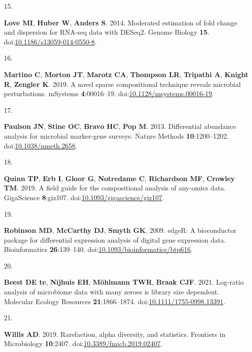 \documentclass[
]{article}
\newlength{\cslhangindent}
\newlength{\csllabelwidth}
\newlength{\cslentryspacingunit} %
\newenvironment{CSLReferences}[2] %
 {%
  \setlength{\parindent}{0pt}
  \ifodd #1
  \let\oldpar\par
  \def\par{\hangindent=\cslhangindent\oldpar}
  \fi
  \setlength{\parskip}{#2\cslentryspacingunit}
 }%
 {}
\newcommand{\CSLLeftMargin}[1]{\parbox[t]{\csllabelwidth}{#1}}
\newcommand{\CSLRightInline}[1]{\parbox[t]{\linewidth - \csllabelwidth}{#1}\break}
\begin{document}
\begin{CSLReferences}{0}{1}
\leavevmode{}%
\CSLLeftMargin{15. }%
\CSLRightInline{\textbf{Love MI}, \textbf{Huber W}, \textbf{Anders S}.
2014. Moderated estimation of fold change and dispersion for {RNA}-seq
data with {DESeq}2. Genome Biology \textbf{15}.
doi:\href{https://doi.org/10.1186/s13059-014-0550-8}{10.1186/s13059-014-0550-8}.}

\leavevmode{}%
\CSLLeftMargin{16. }%
\CSLRightInline{\textbf{Martino C}, \textbf{Morton JT}, \textbf{Marotz
CA}, \textbf{Thompson LR}, \textbf{Tripathi A}, \textbf{Knight R},
\textbf{Zengler K}. 2019. A novel sparse compositional technique reveals
microbial perturbations. {mSystems} \textbf{4}:00016--19.
doi:\href{https://doi.org/10.1128/msystems.00016-19}{10.1128/msystems.00016-19}.}

\leavevmode{}%
\CSLLeftMargin{17. }%
\CSLRightInline{\textbf{Paulson JN}, \textbf{Stine OC}, \textbf{Bravo
HC}, \textbf{Pop M}. 2013. Differential abundance analysis for microbial
marker-gene surveys. Nature Methods \textbf{10}:1200--1202.
doi:\href{https://doi.org/10.1038/nmeth.2658}{10.1038/nmeth.2658}.}

\leavevmode{}%
\CSLLeftMargin{18. }%
\CSLRightInline{\textbf{Quinn TP}, \textbf{Erb I}, \textbf{Gloor G},
\textbf{Notredame C}, \textbf{Richardson MF}, \textbf{Crowley TM}. 2019.
A field guide for the compositional analysis of any-omics data.
{GigaScience} \textbf{8}:giz107.
doi:\href{https://doi.org/10.1093/gigascience/giz107}{10.1093/gigascience/giz107}.}

\leavevmode{}%
\CSLLeftMargin{19. }%
\CSLRightInline{\textbf{Robinson MD}, \textbf{McCarthy DJ},
\textbf{Smyth GK}. 2009. {edgeR}: A bioconductor package for
differential expression analysis of digital gene expression data.
Bioinformatics \textbf{26}:139--140.
doi:\href{https://doi.org/10.1093/bioinformatics/btp616}{10.1093/bioinformatics/btp616}.}

\leavevmode{}%
\CSLLeftMargin{20. }%
\CSLRightInline{\textbf{Beest DE te}, \textbf{Nijhuis EH},
\textbf{Möhlmann TWR}, \textbf{Braak CJF}. 2021. Log-ratio analysis of
microbiome data with many zeroes is library size dependent. Molecular
Ecology Resources \textbf{21}:1866--1874.
doi:\href{https://doi.org/10.1111/1755-0998.13391}{10.1111/1755-0998.13391}.}

\leavevmode{}%
\CSLLeftMargin{21. }%
\CSLRightInline{\textbf{Willis AD}. 2019. Rarefaction, alpha diversity,
and statistics. Frontiers in Microbiology \textbf{10}:2407.
doi:\href{https://doi.org/10.3389/fmicb.2019.02407}{10.3389/fmicb.2019.02407}.}


\end{CSLReferences}
\end{document}
